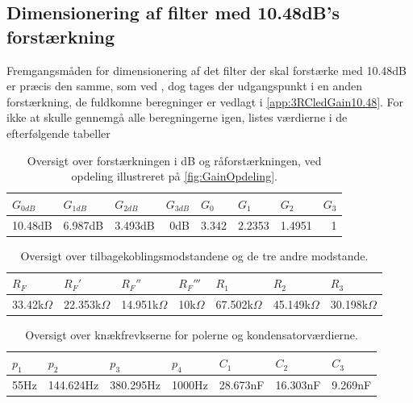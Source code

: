 \subsection{Dimensionering af filter med 10.48dB's forstærkning}
\label{DimensioneringAfFilter10.48}
% 
Fremgangsmåden for dimensionering af det filter der skal forstærke med 10.48dB er præcis den samme, som ved , dog tages der udgangspunkt i en anden forstærkning, de fuldkomne beregninger er vedlagt i \autoref{app:3RCledGain10.48}. For ikke at skulle gennemgå alle beregningerne igen, listes værdierne i de efterfølgende tabeller
%
\begin{table}[H]
\centering
\begin{tabular}{|r|r|r|r|r|r|r|r|}
\hline
\multicolumn{1}{|l|}{$G_{0dB}$} & \multicolumn{1}{l|}{$G_{1dB}$} & \multicolumn{1}{l|}{$G_{2dB}$} & \multicolumn{1}{l|}{$G_{3dB}$} & \multicolumn{1}{l|}{$G_0$} & \multicolumn{1}{l|}{$G_1$} & \multicolumn{1}{l|}{$G_2$} & \multicolumn{1}{l|}{$G_3$} \\ \hline
10.48dB & 6.987dB & 3.493dB & 0dB & 3.342 & 2.2353 & 1.4951 & 1\\ \hline
\end{tabular}
\caption{Oversigt over forstærkningen i dB og råforstærkningen, ved opdeling illustreret på \autoref{fig:GainOpdeling}.}
\label{tab:DimensioneringAf10.48Gain}
\end{table}
\noindent
%
%
\begin{table}[H]
\centering
\begin{tabular}{|r|r|r|r|r|r|r|}
\hline
\multicolumn{1}{|l|}{$R_F$} & \multicolumn{1}{l|}{$R_F'$} & \multicolumn{1}{l|}{$R_F''$} & \multicolumn{1}{l|}{$R_F'''$} & \multicolumn{1}{l|}{$R_1$} & \multicolumn{1}{l|}{$R_2$} & \multicolumn{1}{l|}{$R_3$} \\ \hline
33.42k$\Omega$ & 22.353k$\Omega$ & 14.951k$\Omega$ & 10k$\Omega$ & 67.502k$\Omega$ & 45.149k$\Omega$ & 30.198k$\Omega$\\ \hline
\end{tabular}
\caption{Oversigt over tilbagekoblingsmodstandene og de tre andre modstande.}
\label{tab:DimensioneringAf10.48Modstand}
\end{table}
\noindent
%
%
\begin{table}[H]
\centering
\begin{tabular}{|r|r|r|r|r|r|r|}
\hline
\multicolumn{1}{|l|}{$p_1$} & \multicolumn{1}{l|}{$p_2$} & \multicolumn{1}{l|}{$p_3$} & \multicolumn{1}{l|}{$p_4$} & \multicolumn{1}{l|}{$C_1$} & \multicolumn{1}{l|}{$C_2$} & \multicolumn{1}{l|}{$C_3$} \\ \hline
55Hz & 144.624Hz & 380.295Hz & 1000Hz & 28.673nF & 16.303nF & 9.269nF \\ \hline
\end{tabular}
\caption{Oversigt over knækfrevkserne for polerne og kondensatorværdierne.}
\label{tab:DimensioneringAf10.48polC}
\end{table}
\noindent
%
%
